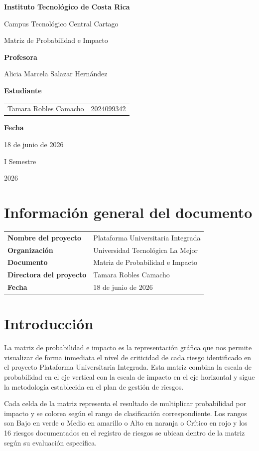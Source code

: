 \documentclass[11pt,spanish]{article}
\title{\DocumentoTitulo}
\author{\AutoresPortada}
\date{\FechaDocumento}
\makeatletter
\newcommand{\Institucion}{Instituto Tecnológico de Costa Rica}
\newcommand{\Campus}{Campus Tecnológico Central Cartago}
\newcommand{\DocumentoTitulo}{Matriz de Probabilidad e Impacto}
\newcommand{\Profesor}{Alicia Marcela Salazar Hernández}
\newcommand{\FechaDocumento}{18 de junio de 2026}
\newcommand{\PeriodoAcademico}{I Semestre}
\newcommand{\AnioDocumento}{2026}
\newcommand{\AutoresPortada}{%
    \begin{tabular}{l@{\hspace{1.5cm}}r}
        Tamara Robles Camacho & 2024099342 \\
    \end{tabular}%
}
\newcommand{\MakeCover}{%
\begin{titlepage}
\thispagestyle{empty}
\centering

{\bfseries \huge \Institucion \par}
\vspace{0.25cm}
{\LARGE \Campus \par}

\vfill

{\huge \DocumentoTitulo \par}

\vfill

{\bfseries \LARGE Profesora \par}
{\Large \Profesor \par}

\vfill

{\bfseries \LARGE Estudiante \par}
{\Large \AutoresPortada \par}

\vfill

{\bfseries\LARGE Fecha \par}
{\Large \FechaDocumento \par}

\vfill

{\LARGE \PeriodoAcademico \par}
{\LARGE \AnioDocumento \par}

\end{titlepage}%
}
\makeatother
\begin{document}
\hypersetup{pageanchor=false}

\MakeCover

\pagestyle{empty}
\tableofcontents
\clearpage
{}
\hypersetup{pageanchor=true}
\pagestyle{fancy}

\section{Información general del documento}

\begin{table}[H]
\centering
\begin{tabularx}{\textwidth}{p{5cm} Y}
\toprule
\textbf{Nombre del proyecto} & Plataforma Universitaria Integrada \\
\textbf{Organización} & Universidad Tecnológica La Mejor \\
\textbf{Documento} & \DocumentoTitulo \\
\textbf{Directora del proyecto} & Tamara Robles Camacho \\
\textbf{Fecha} & \FechaDocumento \\
\bottomrule
\end{tabularx}
\end{table}

\section{Introducción}

La matriz de probabilidad e impacto es la representación gráfica que nos permite visualizar de forma inmediata el nivel de criticidad de cada riesgo identificado en el proyecto Plataforma Universitaria Integrada. Esta matriz combina la escala de probabilidad en el eje vertical con la escala de impacto en el eje horizontal y sigue la metodología establecida en el plan de gestión de riesgos.

Cada celda de la matriz representa el resultado de multiplicar probabilidad por impacto y se colorea según el rango de clasificación correspondiente. Los rangos son Bajo en verde o Medio en amarillo o Alto en naranja o Crítico en rojo y los 16 riesgos documentados en el registro de riesgos se ubican dentro de la matriz según su evaluación específica.
\end{document}
